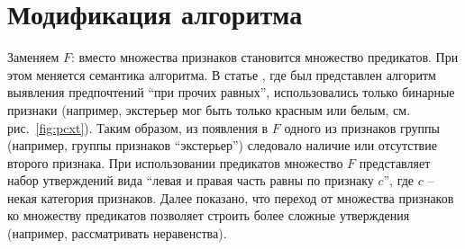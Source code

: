 \chapter{Модификация алгоритма}
\label{chapter:modification}

Заменяем $F$: вместо множества признаков становится множество предикатов. При этом меняется семантика алгоритма. В статье \cite{Obiedkov:2013}, где был представлен алгоритм выявления предпочтений \enquote{при прочих равных}, использовались только бинарные признаки (например, экстерьер мог быть только красным или белым, см. рис.~\ref{fig:pcxt}). Таким образом, из появления в $F$ одного из признаков группы (например, группы признаков ``экстерьер'') следовало наличие или отсутствие второго признака. При использовании предикатов множество $F$ представляет набор утверждений вида ``левая и правая часть равны по признаку $c$'', где $c$ – некая категория признаков. Далее показано, что переход от множества признаков ко множеству предикатов позволяет строить более сложные утверждения (например, рассматривать неравенства).

